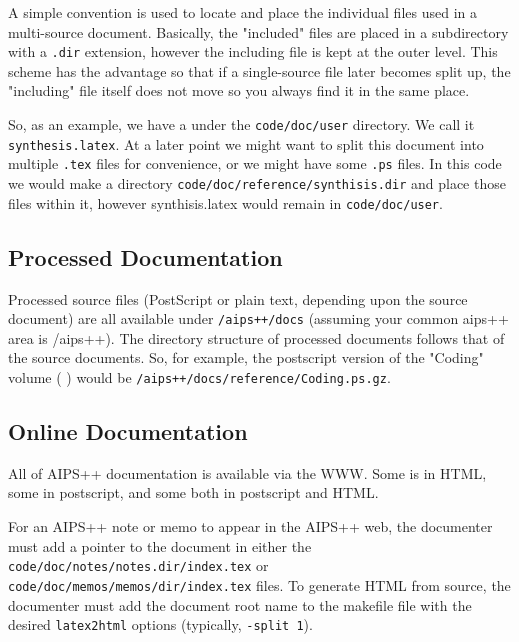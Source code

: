 A simple convention is used to locate and place the individual files
used in a multi-source document. Basically, the "included" files are
placed in a subdirectory with a \texttt{.dir} extension, however the
including file is kept at the outer level. This scheme has the advantage
so that if a single-source file later becomes split up, the "including" file
itself does not move so you always find it in the same place.

So, as an example, we have a \textbf{}
under the
\texttt{code/doc/user} directory. We call it
\texttt{synthesis.latex}.
At a later point we might want to split this document into
multiple \texttt{.tex} files for convenience, or we might have some
\texttt{.ps} files. In this code we would make a directory
\texttt{code/doc/reference/synthisis.dir} and place those files within it,
however synthisis.latex would remain in \texttt{code/doc/user}.

\label{Processed Documentation}
\subsection{Processed Documentation}

Processed source files (PostScript or plain text, depending upon the
source document) are all available under \texttt{/aips++/docs} (assuming
your common aips++ area is /aips++). The directory structure of
processed documents follows that of the source documents.  So, for
example, the postscript version of the "Coding" volume (\textbf{
})
would be \texttt{/aips++/docs/reference/Coding.ps.gz}.

\label{Online Documentation}
\subsection{Online Documentation}

All of AIPS++ documentation is available via the WWW.  Some is in HTML,
some in postscript, and some both in postscript and HTML.  

For an AIPS++ note or memo to appear in the AIPS++ web, the documenter must
add a pointer to the document in either 
the \texttt{code/doc/notes/notes.dir/index.tex} or
\texttt{code/doc/memos/memos/dir/index.tex} files.  To generate HTML from
\latex source, the documenter must add the document root name to the makefile
file with the desired \texttt{latex2html} options (typically, \texttt{-split 1}).

